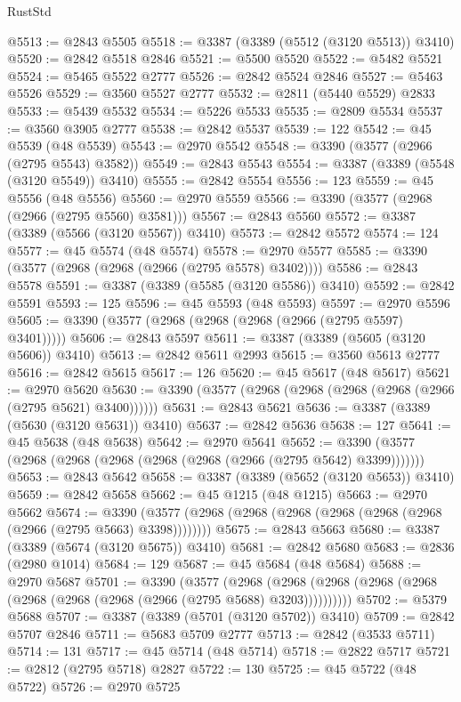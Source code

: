 \begin{lexlean}{RustStd}
\begin{coremodule}
@5513 := @2843 @5505
@5518 := @3387 (@3389 (@5512 (@3120 @5513)) @3410)
@5520 := @2842 @5518 @2846
@5521 := @5500 @5520
@5522 := @5482 @5521
@5524 := @5465 @5522 @2777
@5526 := @2842 @5524 @2846
@5527 := @5463 @5526
@5529 := @3560 @5527 @2777
@5532 := @2811 (@5440 @5529) @2833
@5533 := @5439 @5532
@5534 := @5226 @5533
@5535 := @2809 @5534
@5537 := @3560 @3905 @2777
@5538 := @2842 @5537
@5539 := 122
@5542 := @45 @5539 (@48 @5539)
@5543 := @2970 @5542
@5548 := @3390 (@3577 (@2966 (@2795 @5543) @3582))
@5549 := @2843 @5543
@5554 := @3387 (@3389 (@5548 (@3120 @5549)) @3410)
@5555 := @2842 @5554
@5556 := 123
@5559 := @45 @5556 (@48 @5556)
@5560 := @2970 @5559
@5566 := @3390 (@3577 (@2968 (@2966 (@2795 @5560) @3581)))
@5567 := @2843 @5560
@5572 := @3387 (@3389 (@5566 (@3120 @5567)) @3410)
@5573 := @2842 @5572
@5574 := 124
@5577 := @45 @5574 (@48 @5574)
@5578 := @2970 @5577
@5585 := @3390 (@3577 (@2968 (@2968 (@2966 (@2795 @5578) @3402))))
@5586 := @2843 @5578
@5591 := @3387 (@3389 (@5585 (@3120 @5586)) @3410)
@5592 := @2842 @5591
@5593 := 125
@5596 := @45 @5593 (@48 @5593)
@5597 := @2970 @5596
@5605 := @3390 (@3577 (@2968 (@2968 (@2968 (@2966 (@2795 @5597) @3401)))))
@5606 := @2843 @5597
@5611 := @3387 (@3389 (@5605 (@3120 @5606)) @3410)
@5613 := @2842 @5611 @2993
@5615 := @3560 @5613 @2777
@5616 := @2842 @5615
@5617 := 126
@5620 := @45 @5617 (@48 @5617)
@5621 := @2970 @5620
@5630 := @3390 (@3577 (@2968 (@2968 (@2968 (@2968 (@2966 (@2795 @5621) @3400))))))
@5631 := @2843 @5621
@5636 := @3387 (@3389 (@5630 (@3120 @5631)) @3410)
@5637 := @2842 @5636
@5638 := 127
@5641 := @45 @5638 (@48 @5638)
@5642 := @2970 @5641
@5652 := @3390 (@3577 (@2968 (@2968 (@2968 (@2968 (@2968 (@2966 (@2795 @5642) @3399)))))))
@5653 := @2843 @5642
@5658 := @3387 (@3389 (@5652 (@3120 @5653)) @3410)
@5659 := @2842 @5658
@5662 := @45 @1215 (@48 @1215)
@5663 := @2970 @5662
@5674 := @3390 (@3577 (@2968 (@2968 (@2968 (@2968 (@2968 (@2968 (@2966 (@2795 @5663) @3398))))))))
@5675 := @2843 @5663
@5680 := @3387 (@3389 (@5674 (@3120 @5675)) @3410)
@5681 := @2842 @5680
@5683 := @2836 (@2980 @1014)
@5684 := 129
@5687 := @45 @5684 (@48 @5684)
@5688 := @2970 @5687
@5701 := @3390
    (@3577
      (@2968 (@2968 (@2968 (@2968 (@2968 (@2968 (@2968 (@2968 (@2966 (@2795 @5688) @3203))))))))))
@5702 := @5379 @5688
@5707 := @3387 (@3389 (@5701 (@3120 @5702)) @3410)
@5709 := @2842 @5707 @2846
@5711 := @5683 @5709 @2777
@5713 := @2842 (@3533 @5711)
@5714 := 131
@5717 := @45 @5714 (@48 @5714)
@5718 := @2822 @5717
@5721 := @2812 (@2795 @5718) @2827
@5722 := 130
@5725 := @45 @5722 (@48 @5722)
@5726 := @2970 @5725

\end{coremodule}
\end{lexlean}
